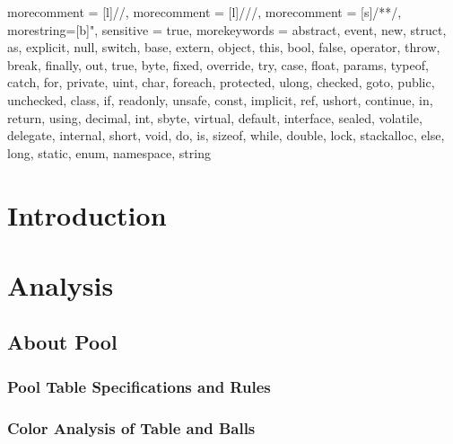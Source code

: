 
\usepackage{float}
\usepackage{graphicx}
\usepackage{listings}
\usepackage{subfig}
\usepackage{longtable}
{
 morecomment = [l]{//}, 
 morecomment = [l]{///},
 morecomment = [s]{/*}{*/},
 morestring=[b]", 
 sensitive = true,
 morekeywords = {abstract,  event,  new,  struct,
   as,  explicit,  null,  switch,
   base,  extern,  object,  this,
   bool,  false,  operator,  throw,
   break,  finally,  out,  true,
   byte,  fixed,  override,  try,
   case,  float,  params,  typeof,
   catch,  for,  private,  uint,
   char,  foreach,  protected,  ulong,
   checked,  goto,  public,  unchecked,
   class,  if,  readonly,  unsafe,
   const,  implicit,  ref,  ushort,
   continue,  in,  return,  using,
   decimal,  int,  sbyte,  virtual,
   default,  interface,  sealed,  volatile,
   delegate,  internal,  short,  void,
   do,  is,  sizeof,  while,
   double,  lock,  stackalloc,   
   else,  long,  static,   
   enum,  namespace,  string}
}
\lstset{language=CSharp}


 







\tableofcontents

\chapter{Introduction}
	

\chapter{Analysis}
	
	\label{sec:analysis}
	
	\section{About Pool}

		\subsection{Pool Table Specifications and Rules}
			\label{sec:rules}
			
	
		\subsection{Color Analysis of Table and Balls}
			\label{sec:analysisballstable}
			

